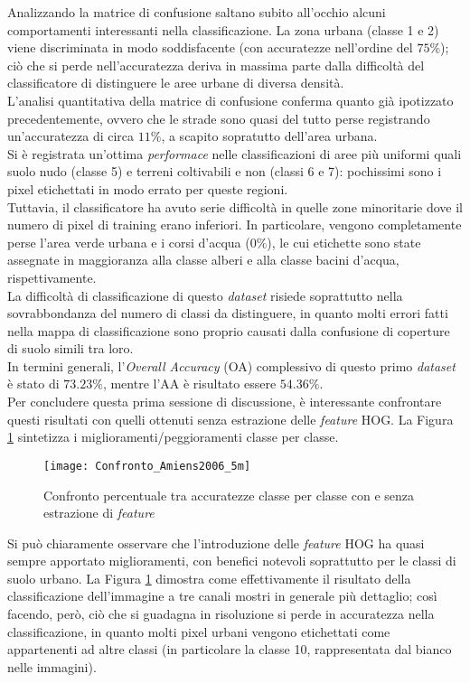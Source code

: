 Analizzando la matrice di confusione saltano subito all'occhio alcuni comportamenti interessanti nella classificazione. La zona urbana (classe 1 e 2) viene discriminata in modo soddisfacente (con accuratezze nell'ordine del $75\%$); ciò che si perde nell'accuratezza deriva in massima parte dalla difficoltà del classificatore di distinguere le aree urbane di diversa densità.\\
L'analisi quantitativa della matrice di confusione conferma quanto già ipotizzato precedentemente,  ovvero che le strade sono quasi del tutto perse registrando un'accuratezza di circa $11\%$, a scapito sopratutto dell'area urbana. \\
Si è registrata un'ottima \emph{performace} nelle classificazioni di aree più uniformi quali suolo nudo (classe 5) e terreni coltivabili e non (classi 6 e 7): pochissimi sono i pixel etichettati in modo errato per queste regioni.\\
Tuttavia, il classificatore ha avuto serie difficoltà in quelle zone minoritarie dove il numero di pixel di training erano inferiori. In particolare, vengono completamente perse l'area verde urbana e i corsi d'acqua ($0\%$), le cui etichette sono state assegnate in maggioranza alla classe alberi e alla classe  bacini d'acqua, rispettivamente.\\
La difficoltà di classificazione di questo \emph{dataset} risiede soprattutto nella sovrabbondanza del numero di classi da distinguere, in quanto molti errori fatti nella mappa di classificazione sono proprio causati dalla confusione di coperture di suolo simili tra loro.\\

In termini generali, l'\emph{Overall Accuracy} (OA) complessivo di questo primo \emph{dataset} è stato di $73.23\%$, mentre l'AA è risultato essere $54.36\%$. 
\\
Per concludere questa prima sessione di discussione, è interessante confrontare questi risultati con quelli ottenuti senza estrazione delle \emph{feature} HOG. La Figura \ref{fig:Confronto_Amiens2006_5m} sintetizza i miglioramenti/peggioramenti classe per classe.
 
 \begin{figure}[!ht]
      \texttt{[image: Confronto\_Amiens2006\_5m]}
    \caption{Confronto percentuale tra accuratezze classe per classe con e senza estrazione di \emph{feature}}
    \label{fig:Confronto_Amiens2006_5m}
  \end{figure}
Si può chiaramente osservare che l'introduzione delle \emph{feature} HOG ha quasi sempre apportato miglioramenti, con benefici notevoli soprattutto per le classi di suolo urbano. La Figura \ref{fig:Confronto_Amiens2006_5m} dimostra come effettivamente il risultato della classificazione dell'immagine a tre canali mostri in generale più dettaglio; così facendo, però, ciò che si guadagna in risoluzione si perde in accuratezza nella classificazione, in quanto molti pixel urbani vengono etichettati come appartenenti ad altre classi (in particolare la classe 10, rappresentata dal bianco nelle immagini).


